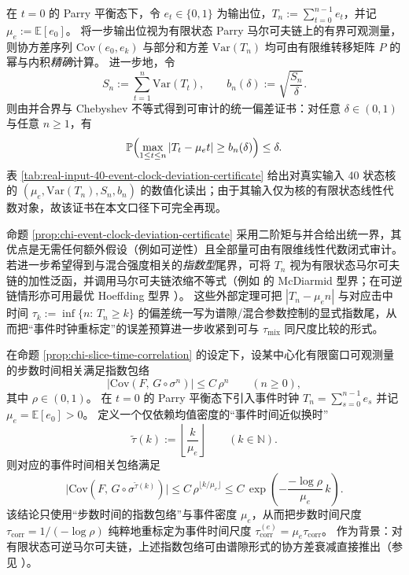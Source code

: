 

\begin{remark}\label{prop:chi-event-clock-deviation-certificate}
在 $t=0$ 的 Parry 平衡态下，令 $e_t\in\{0,1\}$ 为输出位，$T_n:=\sum_{t=0}^{n-1}e_t$，并记 $\mu_e:=\mathbb{E}[e_0]$。
将一步输出位视为有限状态 Parry 马尔可夫链上的有界可观测量，则协方差序列
\(
\mathrm{Cov}(e_0,e_k)
\)
与部分和方差
\(
\mathrm{Var}(T_n)
\)
均可由有限维转移矩阵 $P$ 的幂与内积\emph{精确}计算。
进一步地，令
$$
S_n:=\sum_{t=1}^{n}\mathrm{Var}(T_t),\qquad b_n(\delta):=\sqrt{\frac{S_n}{\delta}}.
$$
则由并合界与 Chebyshev 不等式得到可审计的统一偏差证书：对任意 $\delta\in(0,1)$ 与任意 $n\ge 1$，有
$$
\mathbb{P}\Bigl(\max_{1\le t\le n}|T_t-\mu_e t|\ge b_n(\delta)\Bigr)\le \delta.
$$
表 \ref{tab:real-input-40-event-clock-deviation-certificate} 给出对真实输入 40 状态核的 $(\mu_e,\mathrm{Var}(T_n),S_n,b_n)$ 的数值化读出；由于其输入仅为核的有限状态线性代数对象，故该证书在本文口径下可完全再现。
\end{remark}

\begin{remark}[更强指数型证书的外部定理接口]
命题 \ref{prop:chi-event-clock-deviation-certificate} 采用二阶矩与并合给出统一界，其优点是无需任何额外假设（例如可逆性）且全部量可由有限维线性代数闭式审计。
若进一步希望得到与混合强度相关的\emph{指数型}尾界，可将 $T_n$ 视为有限状态马尔可夫链的加性泛函，并调用马尔可夫链浓缩不等式（例如 \cite{Paulin2015MarkovConcentration} 的 McDiarmid 型界；在可逆链情形亦可用最优 Hoeffding 型界 \cite{LeonPerron2004OptimalHoeffding}）。
这些外部定理可把 $|T_n-\mu_e n|$ 与对应击中时间 $\tau_k:=\inf\{n:\,T_n\ge k\}$ 的偏差统一写为谱隙/混合参数控制的显式指数尾，从而把“事件时钟重标定”的误差预算进一步收紧到可与 $\tau_{\mathrm{mix}}$ 同尺度比较的形式。
\end{remark}



\begin{remark}\label{lem:chi-event-time-rescaling}
在命题 \ref{prop:chi-slice-time-correlation} 的设定下，设某中心化有限窗口可观测量的步数时间相关满足指数包络
$$
\bigl|\mathrm{Cov}(F,\,G\circ\sigma^n)\bigr|\le C\,\rho^n\qquad (n\ge 0),
$$
其中 $\rho\in(0,1)$。
在 $t=0$ 的 Parry 平衡态下引入事件时钟 $T_n=\sum_{s=0}^{n-1}e_s$ 并记 $\mu_e=\mathbb{E}[e_0]>0$。
定义一个仅依赖均值密度的“事件时间近似换时”
$$
\widetilde\tau(k):=\left\lfloor\frac{k}{\mu_e}\right\rfloor\qquad (k\in\mathbb{N}).
$$
则对应的事件时间相关包络满足
$$
\bigl|\mathrm{Cov}(F,\,G\circ\sigma^{\widetilde\tau(k)})\bigr|
\le C\,\rho^{\lfloor k/\mu_e\rfloor}
\le C\,\exp\!\left(-\frac{-\log\rho}{\mu_e}\,k\right).
$$
该结论只使用“步数时间的指数包络”与事件密度 $\mu_e$，从而把步数时间尺度 $\tau_{\mathrm{corr}}=1/(-\log\rho)$ 纯粹地重标定为事件时间尺度 $\tau_{\mathrm{corr}}^{(e)}=\mu_e\tau_{\mathrm{corr}}$。
作为背景：对有限状态可逆马尔可夫链，上述指数包络可由谱隙形式的协方差衰减直接推出（参见 \cite[Chapter~12]{LevinPeresWilmer2009MarkovMixing}）。
\end{remark}

